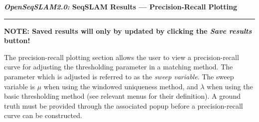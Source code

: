 \centerline{\textbf{\textit{OpenSeqSLAM2.0:} SeqSLAM Results --- Precision-Recall Plotting}}
\noindent\rule{\textwidth}{2pt}
\centerline{\textbf{NOTE: Saved results will only by updated by clicking the \textit{Save results} button!}}
\bigskip
\parbox{\textwidth}{The precision-recall plotting section allows the user to view a precision-recall curve for adjusting the thresholding parameter in a matching method. The parameter which is adjusted is referred to as the \textit{sweep variable}. The sweep variable is $\mu$ when using the windowed uniqueness method, and $\lambda$ when using the basic thresholding method (see relevant menus for their definition). A ground truth must be provided through the associated popup before a precision-recall curve can be constructed.}
\bigskip
